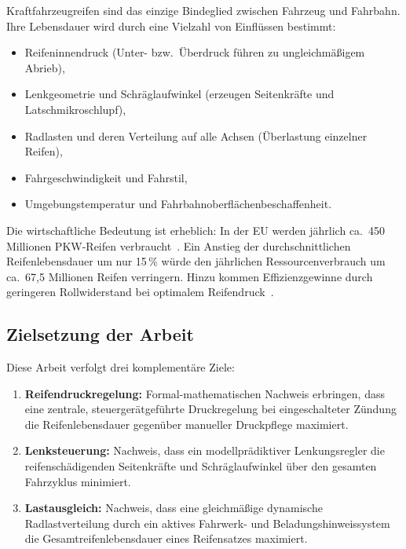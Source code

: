 ﻿\documentclass[12pt,a4paper]{article}
\theoremstyle{definition}
\theoremstyle{remark}
\begin{document}
Kraftfahrzeugreifen sind das einzige Bindeglied zwischen Fahrzeug und Fahrbahn.
Ihre Lebensdauer wird durch eine Vielzahl von Einflüssen bestimmt:

\begin{itemize}[nosep]
  \item Reifeninnendruck (Unter- bzw.\ Überdruck führen zu ungleichmäßigem Abrieb),
  \item Lenkgeometrie und Schräglaufwinkel (erzeugen Seitenkräfte und Latschmikroschlupf),
  \item Radlasten und deren Verteilung auf alle Achsen (Überlastung einzelner Reifen),
  \item Fahrgeschwindigkeit und Fahrstil,
  \item Umgebungstemperatur und Fahrbahnoberflächenbeschaffenheit.
\end{itemize}

Die wirtschaftliche Bedeutung ist erheblich: In der EU werden jährlich ca.\ 450
Millionen PKW-Reifen verbraucht~\cite{ETRMA2023}. Ein Anstieg der durchschnittlichen
Reifenlebensdauer um nur 15\,\% würde den jährlichen Ressourcenverbrauch um ca.\ 67,5
Millionen Reifen verringern. Hinzu kommen Effizienzgewinne durch geringeren Rollwiderstand
bei optimalem Reifendruck~\cite{Sandberg2011}.

\subsection{Zielsetzung der Arbeit}

Diese Arbeit verfolgt drei komplementäre Ziele:

\begin{enumerate}
  \item \textbf{Reifendruckregelung:} Formal-mathematischen Nachweis erbringen, dass
        eine zentrale, steuergerätgeführte Druckregelung bei eingeschalteter Zündung
        die Reifenlebensdauer gegenüber manueller Druckpflege maximiert.
  \item \textbf{Lenksteuerung:} Nachweis, dass ein modellprädiktiver Lenkungsregler
        die reifenschädigenden Seitenkräfte und Schräglaufwinkel über den gesamten
        Fahrzyklus minimiert.
  \item \textbf{Lastausgleich:} Nachweis, dass eine gleichmäßige dynamische Radlastverteilung
        durch ein aktives Fahrwerk- und Beladungshinweissystem die Gesamtreifenlebensdauer
        eines Reifensatzes maximiert.
\end{enumerate}
\end{document}
